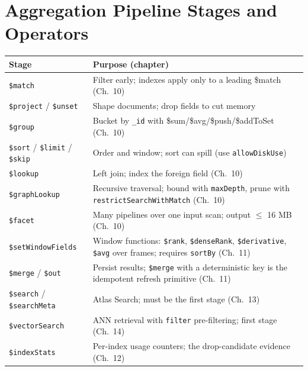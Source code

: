 \section{Aggregation Pipeline Stages and Operators}
%
\begin{center}
\footnotesize
\begin{tabular}{@{}p{3.4cm}p{9.4cm}@{}}
\toprule
\textbf{Stage} & \textbf{Purpose (chapter)} \\
\midrule
\texttt{\$match} & Filter early; indexes apply only to a leading \$match (Ch.~10) \\
\texttt{\$project} / \texttt{\$unset} & Shape documents; drop fields to cut memory \\
\texttt{\$group} & Bucket by \texttt{\_id} with \$sum/\$avg/\$push/\$addToSet (Ch.~10) \\
\texttt{\$sort} / \texttt{\$limit} / \texttt{\$skip} & Order and window; sort can spill (use \texttt{allowDiskUse}) \\
\texttt{\$lookup} & Left join; index the foreign field (Ch.~10) \\
\texttt{\$graphLookup} & Recursive traversal; bound with \texttt{maxDepth}, prune with \texttt{restrictSearchWithMatch} (Ch.~10) \\
\texttt{\$facet} & Many pipelines over one input scan; output $\le$ 16 MB (Ch.~10) \\
\texttt{\$setWindowFields} & Window functions: \texttt{\$rank}, \texttt{\$denseRank}, \texttt{\$derivative}, \texttt{\$avg} over frames; requires \texttt{sortBy} (Ch.~11) \\
\texttt{\$merge} / \texttt{\$out} & Persist results; \texttt{\$merge} with a deterministic key is the idempotent refresh primitive (Ch.~11) \\
\texttt{\$search} / \texttt{\$searchMeta} & Atlas Search; must be the first stage (Ch.~13) \\
\texttt{\$vectorSearch} & ANN retrieval with \texttt{filter} pre-filtering; first stage (Ch.~14) \\
\texttt{\$indexStats} & Per-index usage counters; the drop-candidate evidence (Ch.~12) \\
\bottomrule
\end{tabular}
\end{center}


